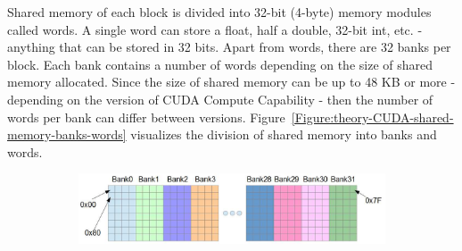 Shared memory of each block is divided into 32-bit (4-byte) memory modules called words. A single word can store a float, half a double, 32-bit int, etc. - anything that can be stored in 32 bits. Apart from words, there are 32 banks per block. Each bank contains a number of words depending on the size of shared memory allocated. Since the size of shared memory can be up to 48 KB or more - depending on the version of CUDA Compute Capability - then the number of words per bank can differ between versions. Figure~\ref{Figure:theory-CUDA-shared-memory-banks-words} visualizes the division of shared memory into banks and words.

\begin{figure}[ht!]
	\centering
	\begin{subfigure}{\textwidth}
		\centering
		\includegraphics[width=14.5cm, keepaspectratio]{images/ch1/CUDA_shared_memory_banks_words.png}
		\label{Figure:theory-CUDA-shared-memory-banks-words-bytes}
	\end{subfigure}


\end{figure}
